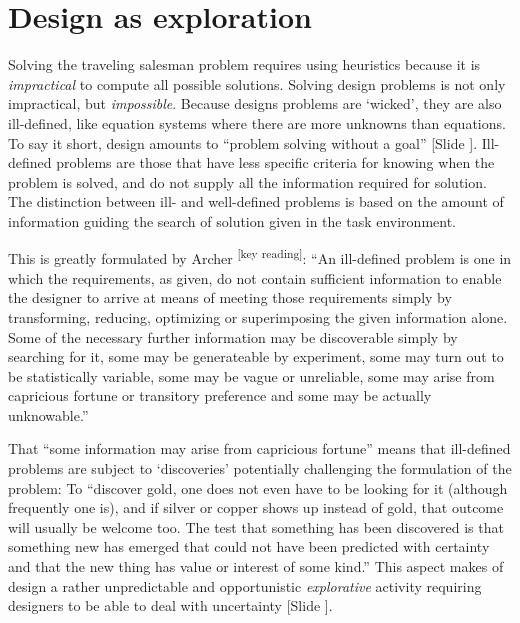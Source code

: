 \documentclass{article}
\newcounter{slide}
\begin{document}
\section{Design as exploration}
\label{sec:illdefined}
Solving the traveling salesman problem requires using heuristics because it is \emph{impractical} to compute all possible solutions. Solving design problems is not only impractical, but \emph{impossible}. Because designs problems are `wicked', they are also ill-defined, like equation systems where there are more unknowns than equations. To say it short, design amounts to ``problem solving without a goal'' {\color{blue}[Slide ]}\cite[p. 106]{simon1996sciences}. Ill-defined problems are those that have less specific criteria for knowing when the problem is solved, and do not supply all the information required for solution. The distinction between ill- and well-defined problems is based on the amount of information guiding the search of solution given in the task environment. 

This is greatly formulated by Archer \cite{archerDesignDiscipline1979}\textsuperscript{\color{Magenta}[key reading]}: ``An ill-defined problem is one in which the requirements, as given, do not contain sufficient information to enable the designer to arrive at means of meeting those requirements simply by transforming, reducing, optimizing or superimposing the given information alone. Some of the necessary further information may be discoverable simply by searching for it, some may be generateable by experiment, some may turn out to be statistically variable, some may be vague or unreliable, some may arise from capricious fortune or transitory preference and some may be actually unknowable.''

That ``some information may arise from capricious fortune'' means that ill-defined problems are subject to `discoveries' potentially challenging the formulation of the problem: To ``discover gold, one does not even have to be looking for it (although frequently one is), and if silver or copper shows up instead of gold, that outcome will usually be welcome too. The test that something has been discovered is that something new has emerged that could not have been predicted with certainty and that the new thing has value or interest of some kind.'' This aspect makes of design a rather unpredictable and opportunistic \emph{explorative} activity requiring designers to be able to deal with uncertainty {\color{blue}[Slide ]}.
\end{document}
